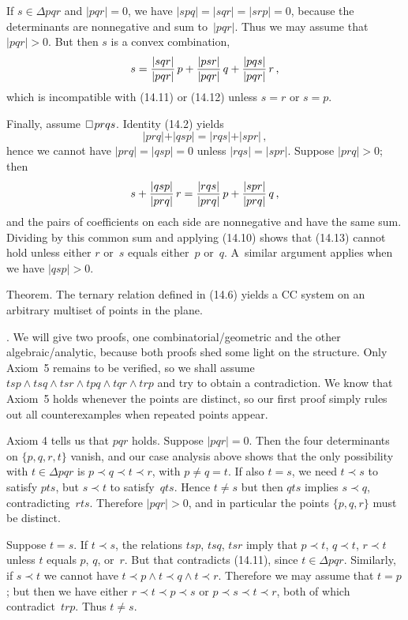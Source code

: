 If $s\in\Delta pqr$ and $\vert pqr\vert=0$, we have $\vert
spq\vert=\vert sqr\vert=\vert srp\vert=0$, because the determinants
are nonnegative and sum to~$\vert pqr\vert$. Thus we may assume that
$\vert pqr\vert >0$. But then $s$ is a convex combination,
$$s={\vert sqr\vert\over \vert pqr\vert}\,p+{\vert psr\vert\over \vert
pqr\vert}\,q+{\vert pqs\vert\over \vert pqr\vert}\,r\,,$$
which is incompatible with (14.11) or (14.12) unless $s=r$ or $s=p$.

Finally, assume $\sqbox prqs$. Identity (14.2) yields
$$\vert prq\vert+\vert qsp\vert=\vert rqs\vert+\vert spr\vert\,,$$
hence we cannot have $\vert prq\vert=\vert qsp\vert=0$ unless $\vert
rqs\vert=\vert spr\vert$. Suppose $\vert prq\vert>0$; then
$$s+{\vert qsp\vert\over\vert prq\vert}\,r={\vert rqs\vert\over\vert
prq\vert}\,p+{\vert spr\vert\over\vert prq\vert}\,q\,,$$
and the pairs of coefficients on each side are nonnegative and have
the same sum. Dividing by this common sum and applying (14.10) shows
that (14.13) cannot hold unless either $r$ or~$s$ equals either~$p$
or~$q$. A~similar argument applies when we have $\vert qsp\vert
>0$.\quad\pfbox

\proclaim Theorem. The ternary relation defined in (14.6) yields a CC
system on an arbitrary multiset of points in the plane.

.\quad
We will give two proofs, one combinatorial/geometric and the other
algebraic/analytic, because both proofs shed some light on the
structure. Only Axiom~5 remains to be verified, so we shall assume
$tsp\wedge tsq\wedge tsr\wedge tpq\wedge tqr\wedge trp$ and try to
obtain a contradiction. We know that Axiom~5 holds whenever the points
are distinct, so our first proof simply rules out all counterexamples
when repeated points appear.

Axiom 4 tells us that $pqr$ holds. Suppose $\vert pqr\vert=0$. Then
the four determinants on $\{p,q,r,t\}$ vanish, and our case analysis
above shows that the only possibility with $t\in\Delta pqr$ is $p\prec
q\prec t\prec r$, with $p\neq q=t$. If also $t=s$, we need $t\prec s$
to satisfy $pts$, but $s\prec t$ to satisfy~$qts$. Hence $t\neq s$
but then $qts$ implies $s\prec q$, contradicting~$rts$. Therefore
$\vert pqr\vert>0$, and in particular the points $\{p,q,r\}$ must be
distinct.

Suppose $t=s$. If $t\prec s$, the relations $tsp$, $tsq$, $tsr$ imply
that $p\prec t$, $q\prec t$, $r\prec t$ unless $t$ equals $p$, $q$,
or~$r$. But that contradicts (14.11), since $t\in\Delta pqr$.
Similarly, if $s\prec t$ we cannot have $t\prec p\wedge t\prec q\wedge
t\prec r$. Therefore we may assume that $t=p$; but then we have either
$r\prec t\prec p\prec s$ or $p\prec s\prec t\prec r$, both of which
contradict~$trp$. Thus $t\neq s$.

